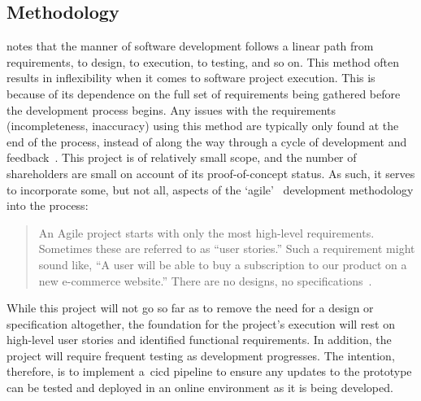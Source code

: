 \subsection{Methodology}\label{subsec:methodology}

\citet{murray-pm} notes that the  manner of software development follows a linear path from requirements, to design, to execution, to testing, and so on.
This method often results in inflexibility when it comes to software project execution.
This is because of its dependence on the full set of requirements being gathered before the development process begins.
Any issues with the requirements (incompleteness, inaccuracy) using this method are typically only found at the end of the process, instead of along the way through a cycle of development and feedback~\citep{murray-pm}.
This project is of relatively small scope, and the number of shareholders are small on account of its proof-of-concept status.
As such, it serves to incorporate some, but not all, aspects of the `\gls{agile}'~\citep{beck2001agile} development methodology into the process:

\begin{quotation}
    An Agile project starts with only the most high-level requirements.
    Sometimes these are referred to as “user stories.”
    Such a requirement might sound like, “A user will be able to buy a subscription to our product on a new e-commerce website.”
    There are no designs, no specifications~\citep{murray-pm}.
\end{quotation}

While this project will not go so far as to remove the need for a design or specification altogether, the foundation for the project’s execution will rest on high-level user stories and identified functional requirements.
In addition, the project will require frequent testing as development progresses.
The intention, therefore, is to implement a~\gls{cicd} pipeline to ensure any updates to the prototype can be tested and deployed in an online environment as it is being developed.
